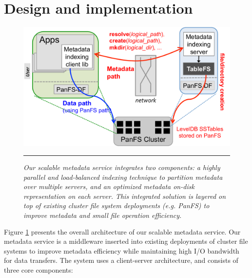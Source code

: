 \section{Design and implementation}

\begin{figure}[t]   %
\centerline{\includegraphics[scale=0.4]{./figs/giga-impl-leveldb-clusterfs}}
\vspace{10pt}
\caption{\textit{
Our scalable metadata service \sys integrates two components: a highly
parallel and load-balanced indexing technique \cite{GIGA11}
to partition metadata over multiple servers,
and an optimized metadata on-disk representation \cite{TableFS} on each server.
This integrated solution is layered on top of existing cluster
file system deployments (e.g. PanFS) to improve metadata
and small file operation efficiency.
}}
\vspace{10pt}
\hrule
\label{fig:design}
\end{figure}       %

Figure \ref{fig:design} presents the overall architecture of our scalable
metadata service. Our metadata service is a middleware inserted into
existing deployments of cluster file systems to improve metadata efficiency
while maintaining high I/O bandwidth for data transfers.
The system uses a client-server architecture,
and consists of three core components:

